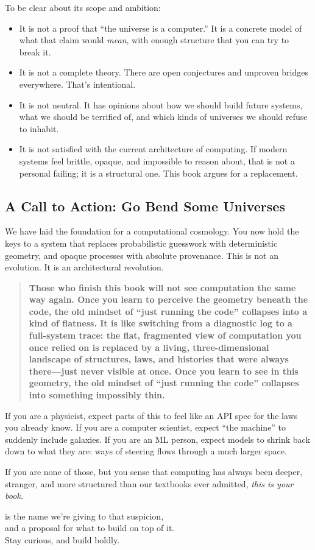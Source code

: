 \noindent
To be clear about its scope and ambition:
\begin{itemize}
  \item It is not a proof that ``the universe is a computer.'' It is a concrete model of what that claim would \emph{mean}, with enough structure that you can try to break it.
  \item It is not a complete theory. There are open conjectures and unproven bridges everywhere. That's intentional.
  \item It is not neutral. It has opinions about how we should build future systems, what we should be terrified of, and which kinds of universes we should refuse to inhabit.
  \item It is not satisfied with the current architecture of computing. If modern systems feel brittle, opaque, and impossible to reason about, that is not a personal failing; it is a structural one. This book argues for a replacement.
\end{itemize}

\subsection*{A Call to Action: Go Bend Some Universes}

We have laid the foundation for a computational cosmology. You now hold the keys to a system that replaces probabilistic guesswork with deterministic geometry, and opaque processes with absolute provenance. This is not an evolution. It is an architectural revolution.

\begin{quote}
\textbf{Those who finish this book will not see computation the same way again. Once you learn to perceive the geometry beneath the code, the old mindset of “just running the code” collapses into a kind of flatness. It is like switching from a diagnostic log to a full-system trace: the flat, fragmented view of computation you once relied on is replaced by a living, three-dimensional landscape of structures, laws, and histories that were always there—just never visible at once. Once you learn to see in this geometry, the old mindset of “just running the code” collapses into something impossibly thin.}
\end{quote}

If you are a physicist, expect parts of this to feel like an API spec for the laws you already know. If you are a computer scientist, expect ``the machine'' to suddenly include galaxies. If you are an ML person, expect models to shrink back down to what they are: ways of steering flows through a much larger space.

If you are none of those, but you sense that computing has always been deeper, stranger, and more structured than our textbooks ever admitted, \emph{this is your book.}

\begin{flushright}
\COMPUTER{} is the name we're giving to that suspicion,\\
and a proposal for what to build on top of it.\\
Stay curious, and build boldly.
\end{flushright}
